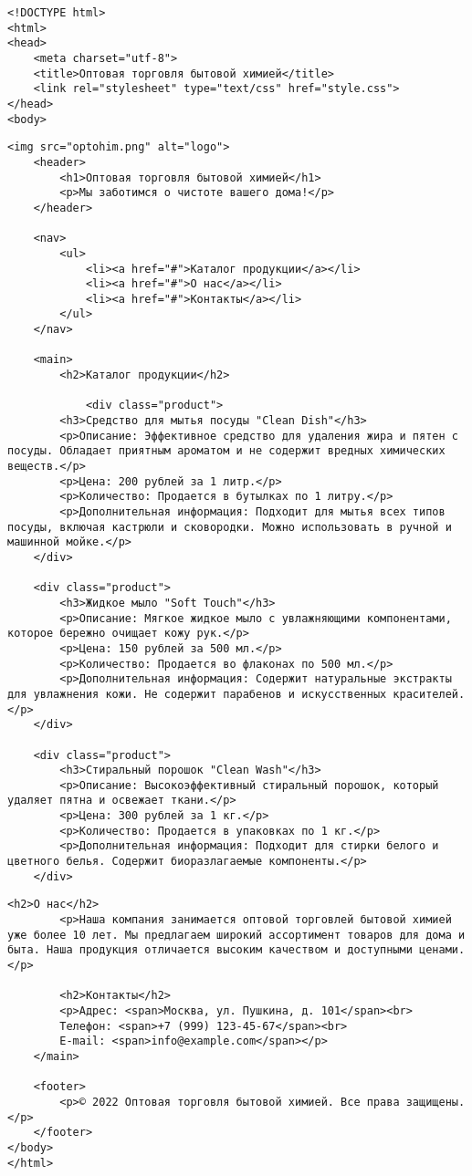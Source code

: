 \documentclass[14pt, a4paper]{extarticle}
\begin{document}
\begin{lstlisting}[caption=Стартовая страница компании\label{list:html}]
<!DOCTYPE html>
<html>
<head>
    <meta charset="utf-8">
    <title>Оптовая торговля бытовой химией</title>
    <link rel="stylesheet" type="text/css" href="style.css">
</head>
<body>
\end{lstlisting}
\begin{lstlisting}[title=Продолжение листинга\;\ref{list:html}]
    <img src="optohim.png" alt="logo">
    <header>
        <h1>Оптовая торговля бытовой химией</h1>
        <p>Мы заботимся о чистоте вашего дома!</p>
    </header>
    
    <nav>
        <ul>
            <li><a href="#">Каталог продукции</a></li>
            <li><a href="#">О нас</a></li>
            <li><a href="#">Контакты</a></li>
        </ul>
    </nav>
    
    <main>
        <h2>Каталог продукции</h2>

            <div class="product">
        <h3>Средство для мытья посуды "Clean Dish"</h3>
        <p>Описание: Эффективное средство для удаления жира и пятен с посуды. Обладает приятным ароматом и не содержит вредных химических веществ.</p>
        <p>Цена: 200 рублей за 1 литр.</p>
        <p>Количество: Продается в бутылках по 1 литру.</p>
        <p>Дополнительная информация: Подходит для мытья всех типов посуды, включая кастрюли и сковородки. Можно использовать в ручной и машинной мойке.</p>
    </div>
    
    <div class="product">
        <h3>Жидкое мыло "Soft Touch"</h3>
        <p>Описание: Мягкое жидкое мыло с увлажняющими компонентами, которое бережно очищает кожу рук.</p>
        <p>Цена: 150 рублей за 500 мл.</p>
        <p>Количество: Продается во флаконах по 500 мл.</p>
        <p>Дополнительная информация: Содержит натуральные экстракты для увлажнения кожи. Не содержит парабенов и искусственных красителей.</p>
    </div>
    
    <div class="product">
        <h3>Стиральный порошок "Clean Wash"</h3>
        <p>Описание: Высокоэффективный стиральный порошок, который удаляет пятна и освежает ткани.</p>
        <p>Цена: 300 рублей за 1 кг.</p>
        <p>Количество: Продается в упаковках по 1 кг.</p>
        <p>Дополнительная информация: Подходит для стирки белого и цветного белья. Содержит биоразлагаемые компоненты.</p>
    </div>
\end{lstlisting}
\begin{lstlisting}[title=Продолжение листинга\;\ref{list:html}]
        <h2>О нас</h2>
        <p>Наша компания занимается оптовой торговлей бытовой химией уже более 10 лет. Мы предлагаем широкий ассортимент товаров для дома и быта. Наша продукция отличается высоким качеством и доступными ценами.</p>
        
        <h2>Контакты</h2>
        <p>Адрес: <span>Москва, ул. Пушкина, д. 101</span><br>
        Телефон: <span>+7 (999) 123-45-67</span><br>
        E-mail: <span>info@example.com</span></p>
    </main>
    
    <footer>
        <p>© 2022 Оптовая торговля бытовой химией. Все права защищены.</p>
    </footer>
</body>
</html>
\end{lstlisting}
\end{document}
